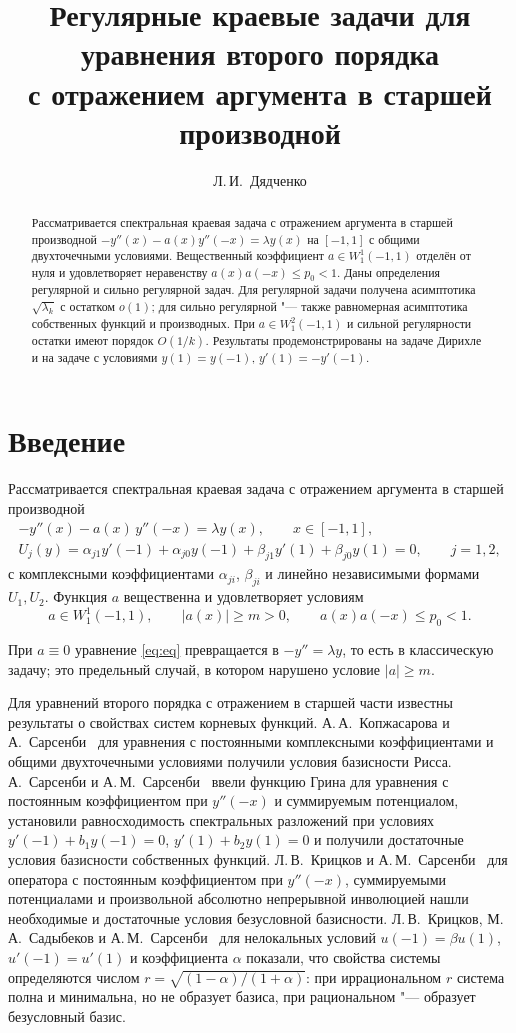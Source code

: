 \documentclass[12pt,a4paper]{article}
\title{Регулярные краевые задачи для уравнения второго порядка\\
с отражением аргумента в старшей производной}
\author{Л.\,И.~Дядченко}
\date{}
\numberwithin{equation}{section}
\theoremstyle{definition}
\newcommand{\abs}[1]{\lvert#1\rvert}
\begin{document}
\maketitle
\begin{abstract}
Рассматривается спектральная краевая задача с отражением аргумента в старшей производной
$-y''(x)-a(x)y''(-x)=\lambda y(x)$ на $[-1,1]$ с общими двухточечными условиями.
Вещественный коэффициент $a\in W^1_1(-1,1)$ отделён от нуля и удовлетворяет неравенству
$a(x)a(-x)\le p_0<1$. Даны определения регулярной и сильно регулярной задач.
Для регулярной задачи получена асимптотика $\sqrt{\lambda_k}$ с остатком $o(1)$;
для сильно регулярной "--- также равномерная асимптотика собственных функций и
производных. При $a\in W^2_1(-1,1)$ и сильной регулярности
остатки имеют порядок $O(1/k)$. Результаты продемонстрированы
на задаче Дирихле и на задаче с условиями $y(1)=y(-1)$, $y'(1)=-y'(-1)$.
\end{abstract}

\section{Введение}

Рассматривается спектральная краевая задача с отражением аргумента в старшей производной
\begin{gather}
 -y''(x)-a(x)\,y''(-x)=\lambda y(x),\qquad x\in[-1,1],\label{eq:eq}\\
 U_j(y)=\alpha_{j1}y'(-1)+\alpha_{j0}y(-1)+\beta_{j1}y'(1)+\beta_{j0}y(1)=0,\qquad j=1,2,\label{eq:bc}
\end{gather}
с комплексными коэффициентами $\alpha_{ji}$, $\beta_{ji}$ и линейно независимыми формами
$U_1,U_2$. Функция $a$ вещественна и удовлетворяет условиям
\[
 a\in W^1_1(-1,1),\qquad \abs{a(x)}\ge m>0,\qquad a(x)a(-x)\le p_0<1.
\]

При $a\equiv0$ уравнение \eqref{eq:eq} превращается в $-y''=\lambda y$, то есть в
классическую задачу; это предельный случай, в котором нарушено условие $\abs a\ge m$.

Для уравнений второго порядка с отражением в старшей части известны результаты о
свойствах систем корневых функций. А.\,А.~Копжасарова и А.~Сарсенби~\cite{KopSar}
для уравнения с постоянными комплексными коэффициентами и общими двухточечными условиями
получили условия базисности Рисса. А.~Сарсенби и А.\,М.~Сарсенби~\cite{Sars} ввели функцию
Грина для уравнения с постоянным коэффициентом при $y''(-x)$ и суммируемым потенциалом,
установили равносходимость спектральных разложений при условиях $y'(-1)+b_1y(-1)=0$,
$y'(1)+b_2y(1)=0$ и получили достаточные условия базисности собственных функций.
Л.\,В.~Крицков и А.\,М.~Сарсенби~\cite{KriSar} для оператора с постоянным коэффициентом
при $y''(-x)$, суммируемыми потенциалами и произвольной абсолютно непрерывной инволюцией
нашли необходимые и достаточные условия безусловной базисности. Л.\,В.~Крицков,
М.\,А.~Садыбеков и А.\,М.~Сарсенби~\cite{KSadSar} для нелокальных условий
$u(-1)=\beta u(1)$, $u'(-1)=u'(1)$ и коэффициента $\alpha$ показали, что свойства системы определяются числом
$r=\sqrt{(1-\alpha)/(1+\alpha)}$: при иррациональном $r$ система полна и минимальна,
но не образует базиса, при рациональном "--- образует безусловный базис.
\end{document}
